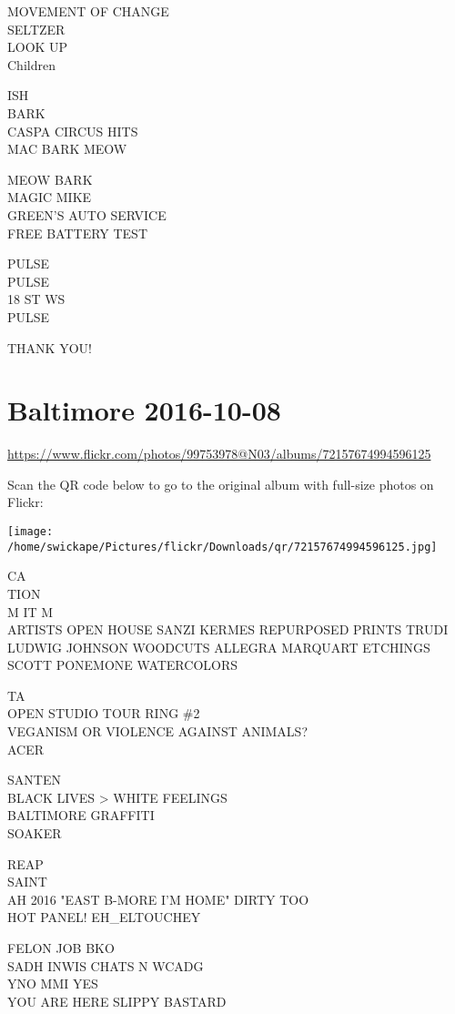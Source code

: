 \documentclass[10pt,letterpaper]{article}
\begin{document}
MOVEMENT OF CHANGE\\
SELTZER\\
LOOK UP\\
Children

ISH\\
BARK\\
CASPA CIRCUS HITS\\
MAC BARK MEOW

MEOW BARK\\
MAGIC MIKE\\
GREEN'S AUTO SERVICE\\
FREE BATTERY TEST

PULSE\\
PULSE\\
18 ST WS\\
PULSE

THANK YOU!


\section*{Baltimore 2016-10-08}

\url{https://www.flickr.com/photos/99753978@N03/albums/72157674994596125}

Scan the QR code below to go to the original album with full-size photos on Flickr:

\texttt{[image: /home/swickape/Pictures/flickr/Downloads/qr/72157674994596125.jpg]}


CA\\
TION\\
M IT M\\
ARTISTS OPEN HOUSE SANZI KERMES REPURPOSED PRINTS TRUDI LUDWIG JOHNSON WOODCUTS ALLEGRA MARQUART ETCHINGS SCOTT PONEMONE WATERCOLORS

TA\\
OPEN STUDIO TOUR RING \#2\\
VEGANISM OR VIOLENCE AGAINST ANIMALS?\\
ACER

SANTEN\\
BLACK LIVES > WHITE FEELINGS\\
BALTIMORE GRAFFITI\\
SOAKER

REAP\\
SAINT\\
AH 2016 "EAST B{-}MORE I'M HOME"  DIRTY TOO\\
HOT PANEL! EH\_ELTOUCHEY

FELON JOB BKO\\
SADH INWIS CHATS N WCADG\\
YNO MMI YES\\
YOU ARE HERE SLIPPY BASTARD
\end{document}
